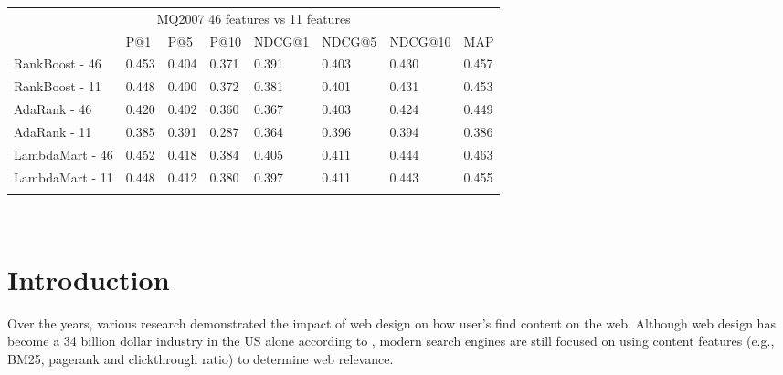 
\begin{table}[t]
\begin{center}
\begin{tabular}{llllllll}
\multicolumn{8}{c}{MQ2007 46 features vs 11 features}                                     \\
           & P@1    & P@5    & P@10   & NDCG@1 & NDCG@5 & NDCG@10 & MAP    \\ \hline
RankBoost - 46  & 0.453 & 0.404 & 0.371 & 0.391 & 0.403 & 0.430  & 0.457 \\
RankBoost - 11 & 0.448 & 0.400 & 0.372 & 0.381  & 0.401  & 0.431   & 0.453 \\ \hline
AdaRank - 46  & 0.420 & 0.402 & 0.360 & 0.367 & 0.403 & 0.424  & 0.449 \\
AdaRank - 11  & 0.385 & 0.391 & 0.287 & 0.364  & 0.396  & 0.394   & 0.386 \\ \hline
LambdaMart - 46 & 0.452 & 0.418 & 0.384 & 0.405 & 0.411 & 0.444  & 0.463 \\
LambdaMart - 11 & 0.448 & 0.412 & 0.380 & 0.397  & 0.411  & 0.443   & 0.455 \\
\hline
\\
\end{tabular}
\\
\label{tab:11vs46}
\end{center}
\end{table}



\section{Introduction}
Over the years, various research demonstrated the impact of web design on how user's find content on the web\cite{nielsen1999designing}\cite{nielsen2006f}\cite{pernice2017f}.  Although web design has become a 34 billion dollar industry in the US alone according to \citet{ibisdesign}, modern search engines are still focused on using content features (e.g., BM25, pagerank and clickthrough ratio) to determine web relevance. 


